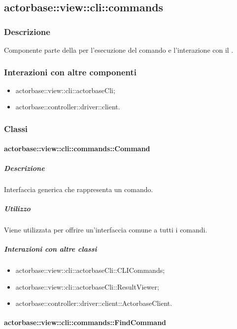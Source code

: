 \documentclass{scalatekids-article}
\begin{document}
\subsection{actorbase::view::cli::commands}

\subsubsection{Descrizione}

Componente parte della  per l'esecuzione del comando e l'interazione con il .

\subsubsection{Interazioni con altre componenti}

\begin{itemize}
\item actorbase::view::cli::actorbaseCli;
\item actorbase::controller::driver::client.
\end{itemize}

\subsubsection{Classi}

\paragraph{actorbase::view::cli::commands::Command}

\subparagraph{Descrizione}

Interfaccia generica che rappresenta un comando.

\subparagraph{Utilizzo}

Viene utilizzata per offrire un'interfaccia comune a tutti i comandi.

\subparagraph{Interazioni con altre classi}

\begin{itemize}
\item actorbase::view::cli::actorbaseCli::CLICommands;
\item actorbase::view::cli::actorbaseCli::ResultViewer;
\item actorbase::controller::driver::client::ActorbaseClient.
\end{itemize}

\paragraph{actorbase::view::cli::commands::FindCommand}
\end{document}
